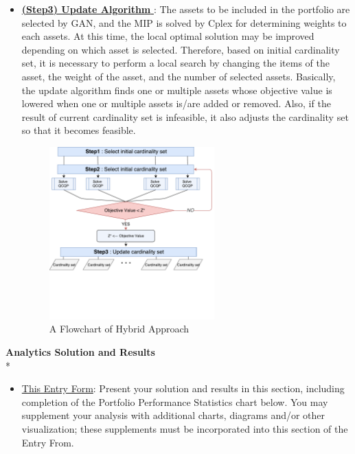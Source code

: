 \documentclass[11pt]{article}
\begin{document}
\begin{itemize}
	
	
	\item[]\underline{\textbf{(Step3) Update Algorithm }} :  The assets to be included in the portfolio are selected by GAN, and the MIP is solved by Cplex for determining weights to each assets. At this time, the local optimal solution may be improved depending on which asset is selected. Therefore, based on initial cardinality set, it is necessary to perform a local search by changing the items of the asset, the weight of the asset, and the number of selected assets. Basically, the update algorithm finds one or multiple assets whose objective value is lowered when one or multiple assets is/are added or removed. Also, if the result of current cardinality set is infeasible, it also adjusts the cardinality set so that it becomes feasible. 
	
	
	
	\begin{figure}[h] 
		\begin{center}
			\includegraphics[width=0.6\textwidth]{step3}
			\caption{A Flowchart of Hybrid Approach} \label{fig:step3}
		\end{center}
	\end{figure}
	
	


\end{itemize}
\textbf{Analytics Solution and Results}\\*




\begin{itemize}
\item \underline {This Entry Form}: Present your solution and results in this section, including completion of the Portfolio Performance Statistics chart below. You may supplement your analysis with additional charts, diagrams and/or other visualization; these supplements must be incorporated into this section of the Entry From.
\end{itemize}
\end{document}
